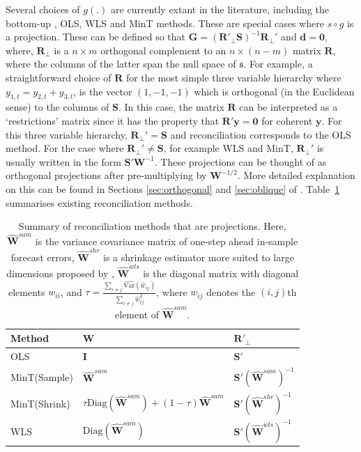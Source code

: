 \documentclass[12pt]{article}
\def\var{\text{Var}}
\theoremstyle{definition}
\begin{document}
Several choices of $g(.)$ are currently extant in the literature, including the bottom-up \citep{Dunn1976}, OLS, WLS and MinT \citep{HynEtAl2011,WicEtAl2019} methods. These are special cases where $s\circ g$ is a projection. These can be defined so that $\bm{G}=({\bm{R}'_{\perp}}\bm{S})^{-1}\bm{R}_{\perp}'$ and $\bm{d}=\bm{0}$, where, ${\bm{R}_{\perp}}$ is a $n\times m$ orthogonal complement to an $n \times (n-m)$ matrix $\bm{R}$, where the columns of the latter span the null space of $\mathfrak{s}$. For example, a straightforward choice of $\bm{R}$ for the most simple three variable hierarchy where $y_{1,t}=y_{2,t}+y_{3,t}$, is the vector $(1,-1,-1)$ which is orthogonal (in the Euclidean sense) to the columns of $\bm{S}$. In this case, the matrix $\bm{R}$ can be interpreted as a `restrictions' matrix since it has the property that $\bm{R}'\bm{y}=\bm{0}$ for coherent $\bm{y}$. For this three variable hierarchy, $\bm{R}_\perp'=\bm{S}$ and reconciliation corresponds to the OLS method. For the case where $\bm{R}_\perp'\neq\bm{S}$, for example WLS and MinT,
$\bm{R}_\perp'$ is usually written in the form $\bm{S}'{\bm{W}}^{-1}$. These projections can be thought of as orthogonal projections after pre-multiplying by ${\bm{W}^{-1/2}}$. More detailed explanation on this can be found in Sections \ref{sec:orthogonal} and \ref{sec:oblique} of \citep{PanEtAl2019HF}. Table~\ref{table:ReconMethods} summarises existing reconciliation methods.

\begin{table}[!h]
	\caption{Summary of reconciliation methods that are projections. Here, $\hat{\bm{W}}^{sam}$ is the variance covariance matrix of one-step ahead in-sample forecast errors, $\hat{\bm{W}}^{shr}$ is a shrinkage estimator more suited to large dimensions proposed by \citet{Schafer2005}, $\hat{\bm{W}}^{wls}$ is the diagonal matrix with diagonal elements $w_{ii}$, and $\tau = \frac{\sum_{i \neq j}\hat{\var}(\hat{w}_{ij})}{\sum_{i \neq j}{\hat{w}}^2_{ij}}$, where $w_{ij}$ denotes the $(i,j)$th element of $\hat{\bm{W}}^{sam}$.}\label{table:ReconMethods}
	\centering
	\begin{tabular}{lll}
		\toprule
		\textbf{Method} & \textbf{$\bm{W}$} & \textbf{ $\bm{R}'_\bot$}      \\
		\midrule
		OLS             &
		$\bm{I}$  &
		$\bm{S}'$  \\
		MinT(Sample)    &
		$\hat{\bm{W}}^{sam}$ &
		$\bm{S}'(\hat{\bm{W}}^{sam})^{-1}$ \\
		MinT(Shrink)    &
		$\tau\text{Diag}(\hat{\bm{W}}^{sam}) + (1-\tau)\hat{\bm{W}}^{sam}$ &
		$\bm{S}'(\hat{\bm{W}}^{shr})^{-1}$ \\
		WLS       &
		$\text{Diag}(\hat{\bm{W}}^{sam})$ &
		$\bm{S}'(\hat{\bm{W}}^{wls})^{-1}$ \\
		\bottomrule
	\end{tabular}
\end{table}
\end{document}
